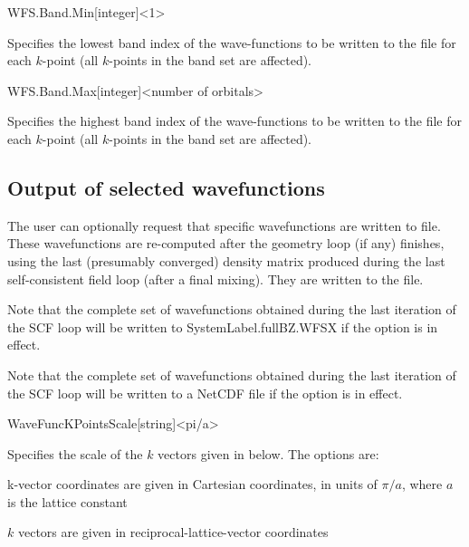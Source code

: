\begin{fdfentry}{WFS.Band.Min}[integer]<1>
  
  Specifies the lowest band index of the wave-functions to be written
  to the file  for each $k$-point (all $k$-points in the
  band set are affected).

\end{fdfentry}

\begin{fdfentry}{WFS.Band.Max}[integer]<number of orbitals>
  
  Specifies the highest band index of the wave-functions to be written
  to the file  for each $k$-point (all $k$-points in the
  band set are affected).

\end{fdfentry}

\subsection{Output of selected wavefunctions}
\label{sec:wf-output-user}

The user can optionally request that specific wavefunctions are
written to file. These wavefunctions are re-computed after the
geometry loop (if any) finishes, using the last (presumably converged)
density matrix produced during the last self-consistent field loop
(after a final mixing). They are written to the
 file.

Note that the complete set of wavefunctions obtained during the last
iteration of the SCF loop will be written to SystemLabel.fullBZ.WFSX
if the  option is in effect.

Note that the complete set of wavefunctions obtained during the last
iteration of the SCF loop will be written to a NetCDF file
 if the  option is in effect.

\begin{fdfentry}{WaveFuncKPointsScale}[string]<pi/a>
  
  Specifies the scale of the $k$ vectors given in
   below.  The options are:
  \begin{fdfoptions}
    \option[pi/a]%
    k-vector coordinates are given in Cartesian coordinates, in units
    of $\pi/a$, where $a$ is the lattice constant

    \option[ReciprocalLatticeVectors]%
    $k$ vectors are given in reciprocal-lattice-vector coordinates

  \end{fdfoptions}

\end{fdfentry}

